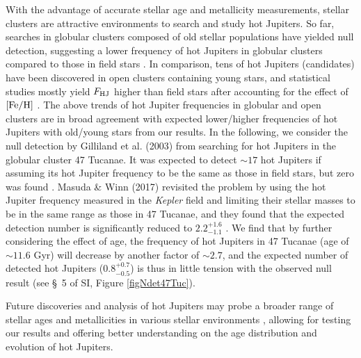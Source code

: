 \documentclass[twocolumn]{pnas-new}
\begin{document}
With the advantage of accurate stellar age and metallicity measurements, stellar clusters are attractive environments to search and study hot Jupiters. So far, searches in globular clusters composed of old stellar populations have yielded null detection, suggesting a lower frequency of hot Jupiters in globular clusters compared to those in field stars \citep{2000ApJ...545L..47G,2008ApJ...674.1117W,2012A&A...541A.144N,2017AJ....153..187M}.
In comparison, tens of hot Jupiters (candidates) have been discovered in open clusters containing young stars, and statistical studies mostly yield $F_{\rm HJ}$ higher than field stars after accounting for the effect of $\rm [Fe/H]$ \citep[see \S~5 of SI, Table \ref{tab:FHJClusters}; e.g.,][]{2012ApJ...756L..33Q,2014ApJ...787...27Q,2014A&A...561L...9B,2016A&A...592L...1B,2017A&A...603A..85B}. The above trends of hot Jupiter frequencies in globular and open clusters are in broad agreement with expected lower/higher frequencies of hot Jupiters with old/young stars from our results. In the following, we consider the null detection by Gilliland et al. (2003) from searching for hot Jupiters in the globular cluster 47 Tucanae. It was expected to detect $\sim 17$ hot Jupiters if assuming its hot Jupiter frequency to be the same as those in field stars, but zero was found \citep{2003ApJ...585.1056G}.
Masuda \& Winn (2017) revisited the problem by using the hot Jupiter frequency measured in the {\it Kepler} field and limiting their stellar masses to be in the same range as those in 47 Tucanae, and they found that the expected detection number is significantly reduced to $2.2^{+1.6}_{-1.1}$ \citep{2017AJ....153..187M}.
We find that by further considering the effect of age, the frequency of hot Jupiters in 47 Tucanae (age of $\sim 11.6$ Gyr) will decrease by another factor of $\sim 2.7$, and 
the expected number of detected hot Jupiters ($0.8^{+0.7}_{-0.5}$) is thus in little tension with the observed null result (see \S~5 of SI, Figure \ref{figNdet47Tuc}).

Future discoveries and analysis of hot Jupiters \citep[e.g.,][]{2022AJ....164...70Y,2023ApJS..265....1Y} may probe a broader range of stellar ages and metallicities in various stellar environments \citep[e.g., star formation regions, stellar clusters, associations, halo][]{2017MNRAS.467.1342Y,2018ARA&A..56..175D}, allowing for testing our results and offering better understanding on the age distribution and evolution of hot Jupiters.

\end{document}
